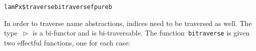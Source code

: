 \documentclass[9pt,preprint,authoryear]{sigplanconf}
\begin{document}
{{{}\vphantom{$\{$}}}\textcolor[rgb]{0,0,0.80}{\texttt{\mbox{\hspace{0.50em}}}}\textcolor[rgb]{0,0,0.80}{\texttt{\mbox{\hspace{0.50em}}}}\textcolor[rgb]{0,0,0.80}{\texttt{\mbox{\hspace{0.50em}}}}\textcolor[rgb]{0,0,0.80}{\texttt{\mbox{\hspace{0.50em}}}}\textcolor[rgb]{0,0,0.80}{\texttt{\mbox{\hspace{0.50em}}}}\textcolor[rgb]{0,0,0.80}{\texttt{\mbox{\hspace{0.50em}}}}\textcolor[rgb]{0,0,0.80}{\texttt{lamP}}\textcolor[rgb]{0,0,0.80}{\texttt{\mbox{\hspace{0.50em}}}}\textcolor[rgb]{0,0,0.80}{\texttt{x}}\textcolor[rgb]{0,0,0.80}{\texttt{\mbox{\hspace{0.50em}}}}\textcolor[rgb]{0,0,0.80}{\texttt{\makebox[1.22ex][c]{\textless{}}\${}\makebox[1.22ex][c]{\textgreater{}}}}\textcolor[rgb]{0,0,0.80}{\texttt{\mbox{\hspace{0.50em}}}}\textcolor[rgb]{0,0,0.80}{\texttt{traverse}}\textcolor[rgb]{0,0,0.80}{\texttt{\mbox{\hspace{0.50em}}}}\textcolor[cmyk]{0,0.65,0.99,0}{\texttt{\makebox[1.22ex][l]{$ {(} $}}}\textcolor[rgb]{0,0,0.80}{\texttt{bitraverse}}\textcolor[rgb]{0,0,0.80}{\texttt{\mbox{\hspace{0.50em}}}}\textcolor[rgb]{0,0,0.80}{\texttt{f}}\textcolor[rgb]{0,0,0.80}{\texttt{\mbox{\hspace{0.50em}}}}\textcolor[rgb]{0,0,0.80}{\texttt{pure}}\textcolor[cmyk]{0,0.65,0.99,0}{\texttt{\makebox[1.22ex][r]{$ {)} $}}}\textcolor[rgb]{0,0,0.80}{\texttt{\mbox{\hspace{0.50em}}}}\textcolor[rgb]{0,0,0.80}{\texttt{b}}\textcolor[rgb]{0,0,0.80}{\texttt{{\nopagebreak \newline%
}\vphantom{$\{$}}}%


%
In order to traverse name abstractions, indices need to be traversed
    as well. The type{~}\textcolor[cmyk]{0,0.65,0.99,0}{\texttt{\makebox[1.22ex][l]{$ {(} $}}}\textcolor[rgb]{0,0,0.80}{\texttt{$ \vartriangleright $}}\textcolor[cmyk]{0,0.65,0.99,0}{\texttt{\makebox[1.22ex][r]{$ {)} $}}} is a bi-functor and is bi-traversable.
    The function{~}\textcolor[rgb]{0,0,0.80}{\texttt{bitraverse}} is given two effectful functions, one for
    each case{:}%


{\nopagebreak }
\end{document}

